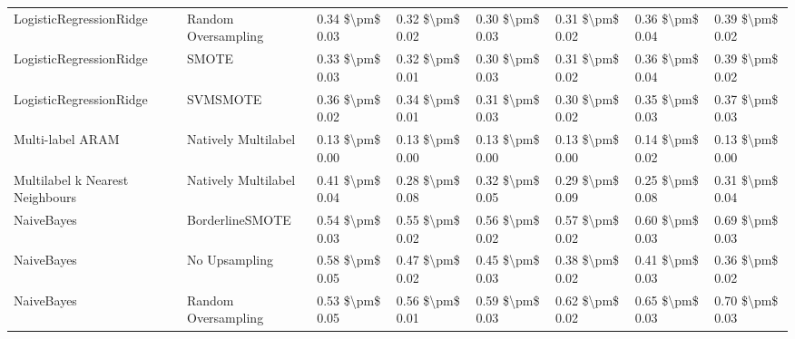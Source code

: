 \begin{tabular}{llllllll}
        LogisticRegressionRidge &           Random Oversampling & 0.34 \$\textbackslash pm\$ 0.03 &           0.32 \$\textbackslash pm\$ 0.02 &       0.30 \$\textbackslash pm\$ 0.03 &        0.31 \$\textbackslash pm\$ 0.02 &                         0.36 \$\textbackslash pm\$ 0.04 & 0.39 \$\textbackslash pm\$ 0.02 \\
        LogisticRegressionRidge &                         SMOTE & 0.33 \$\textbackslash pm\$ 0.03 &           0.32 \$\textbackslash pm\$ 0.01 &       0.30 \$\textbackslash pm\$ 0.03 &        0.31 \$\textbackslash pm\$ 0.02 &                         0.36 \$\textbackslash pm\$ 0.04 & 0.39 \$\textbackslash pm\$ 0.02 \\
        LogisticRegressionRidge &                      SVMSMOTE & 0.36 \$\textbackslash pm\$ 0.02 &           0.34 \$\textbackslash pm\$ 0.01 &       0.31 \$\textbackslash pm\$ 0.03 &        0.30 \$\textbackslash pm\$ 0.02 &                         0.35 \$\textbackslash pm\$ 0.03 & 0.37 \$\textbackslash pm\$ 0.03 \\
               Multi-label ARAM &           Natively Multilabel & 0.13 \$\textbackslash pm\$ 0.00 &           0.13 \$\textbackslash pm\$ 0.00 &       0.13 \$\textbackslash pm\$ 0.00 &        0.13 \$\textbackslash pm\$ 0.00 &                         0.14 \$\textbackslash pm\$ 0.02 & 0.13 \$\textbackslash pm\$ 0.00 \\
Multilabel k Nearest Neighbours &           Natively Multilabel & 0.41 \$\textbackslash pm\$ 0.04 &           0.28 \$\textbackslash pm\$ 0.08 &       0.32 \$\textbackslash pm\$ 0.05 &        0.29 \$\textbackslash pm\$ 0.09 &                         0.25 \$\textbackslash pm\$ 0.08 & 0.31 \$\textbackslash pm\$ 0.04 \\
                     NaiveBayes &               BorderlineSMOTE & 0.54 \$\textbackslash pm\$ 0.03 &           0.55 \$\textbackslash pm\$ 0.02 &       0.56 \$\textbackslash pm\$ 0.02 &        0.57 \$\textbackslash pm\$ 0.02 &                         0.60 \$\textbackslash pm\$ 0.03 & 0.69 \$\textbackslash pm\$ 0.03 \\
                     NaiveBayes &                 No Upsampling & 0.58 \$\textbackslash pm\$ 0.05 &           0.47 \$\textbackslash pm\$ 0.02 &       0.45 \$\textbackslash pm\$ 0.03 &        0.38 \$\textbackslash pm\$ 0.02 &                         0.41 \$\textbackslash pm\$ 0.03 & 0.36 \$\textbackslash pm\$ 0.02 \\
                     NaiveBayes &           Random Oversampling & 0.53 \$\textbackslash pm\$ 0.05 &           0.56 \$\textbackslash pm\$ 0.01 &       0.59 \$\textbackslash pm\$ 0.03 &        0.62 \$\textbackslash pm\$ 0.02 &                         0.65 \$\textbackslash pm\$ 0.03 & 0.70 \$\textbackslash pm\$ 0.03 \\

\end{tabular}
